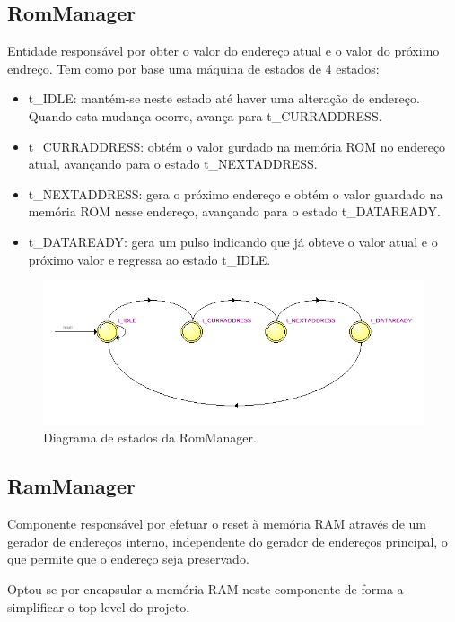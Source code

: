 \documentclass{report}
\begin{document}
\subsection*{RomManager}

Entidade responsável por obter o valor do endereço atual e o valor do próximo endreço. Tem como por base uma máquina de estados de 4 estados:

\begin{itemize}
    \item t\_IDLE: mantém-se neste estado até haver uma alteração de endereço. Quando esta mudança ocorre, avança para t\_CURRADDRESS.
    \item t\_CURRADDRESS: obtém o valor gurdado na memória ROM no endereço atual, avançando para o estado t\_NEXTADDRESS.
    \item t\_NEXTADDRESS: gera o próximo endereço e obtém o valor guardado na memória ROM nesse endereço, avançando para o estado t\_DATAREADY.
    \item t\_DATAREADY: gera um pulso indicando que já obteve o valor atual e o próximo valor e regressa ao estado t\_IDLE.
\end{itemize}

\begin{figure}[H]
    \centering
    \includegraphics[width=\textwidth]{rommanager.png}
    \caption{Diagrama de estados da RomManager.}
\end{figure}

\subsection*{RamManager}

Componente responsável por efetuar o reset à memória RAM através de um gerador de endereços interno, independente do gerador de endereços principal, o que permite que o endereço seja preservado.

Optou-se por encapsular a memória RAM neste componente de forma a simplificar o top-level do projeto.
\end{document}
